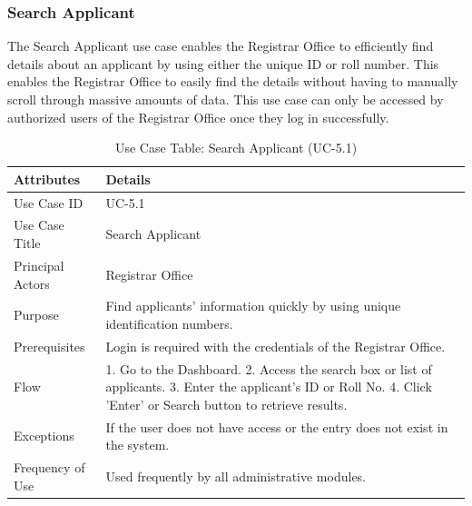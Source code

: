 \subsubsection{Search Applicant}
The Search Applicant use case enables the Registrar Office to efficiently find details about an applicant by using either the unique ID or roll number. This enables the Registrar Office to easily find the details without having to manually scroll through massive amounts of data. This use case can only be accessed by authorized users of the Registrar Office once they log in successfully.
\begin{table}[H]
    \centering
    \small
    \renewcommand{\arraystretch}{1.4}
    \caption{Use Case Table: Search Applicant (UC-5.1)} %
    \label{tab:search-applicant-registrar}
    \begin{tabularx}{\textwidth}{|l|X|}
        \hline
        \rowcolor[gray]{0.9} {Attributes} & {Details} \\ \hline
        Use Case ID & UC-5.1 \\ \hline
        Use Case Title & Search Applicant \\ \hline
        Principal Actors & Registrar Office \\ \hline
        Purpose & Find applicants' information quickly by using unique identification numbers. \\ \hline
        Prerequisites & Login is required with the credentials of the Registrar Office. \\ \hline
        Flow & 1. Go to the Dashboard. 2. Access the search box or list of applicants. 3. Enter the applicant's ID or Roll No. 4. Click 'Enter' or Search button to retrieve results. \\ \hline
        Exceptions & If the user does not have access or the entry does not exist in the system. \\ \hline
        Frequency of Use & Used frequently by all administrative modules. \\ \hline
    \end{tabularx}
\end{table}
\FloatBarrier